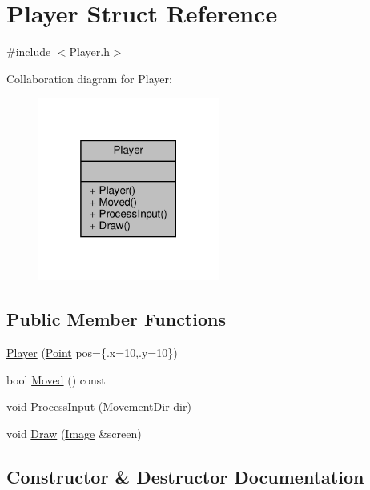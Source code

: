 \hypertarget{structPlayer}{}\section{Player Struct Reference}
\label{structPlayer}


{\ttfamily \#include $<$Player.\+h$>$}



Collaboration diagram for Player\+:
\nopagebreak
\begin{figure}[H]
\begin{center}
\leavevmode
\includegraphics[width=169pt]{structPlayer__coll__graph}
\end{center}
\end{figure}
\subsection*{Public Member Functions}
\begin{DoxyCompactItemize}
\item 
\hyperlink{structPlayer_a02434d25ce99e4bedb9f30c6cd76c73c}{Player} (\hyperlink{structPoint}{Point} pos=\{.x=10,.y=10\})
\item 
bool \hyperlink{structPlayer_a743da3dcbc81ed11bfcb81943aae175b}{Moved} () const
\item 
void \hyperlink{structPlayer_a4b275c51f881fb61b52d1ede3d1dcba3}{Process\+Input} (\hyperlink{Player_8h_aa91f5cffa9b1b82e96c8824b1fe5c61f}{Movement\+Dir} dir)
\item 
void \hyperlink{structPlayer_a1a10995b61d63b46c6b562bd026382c4}{Draw} (\hyperlink{structImage}{Image} \&screen)
\end{DoxyCompactItemize}


\subsection{Constructor \& Destructor Documentation}
\mbox{\label{structPlayer_a02434d25ce99e4bedb9f30c6cd76c73c}} 
